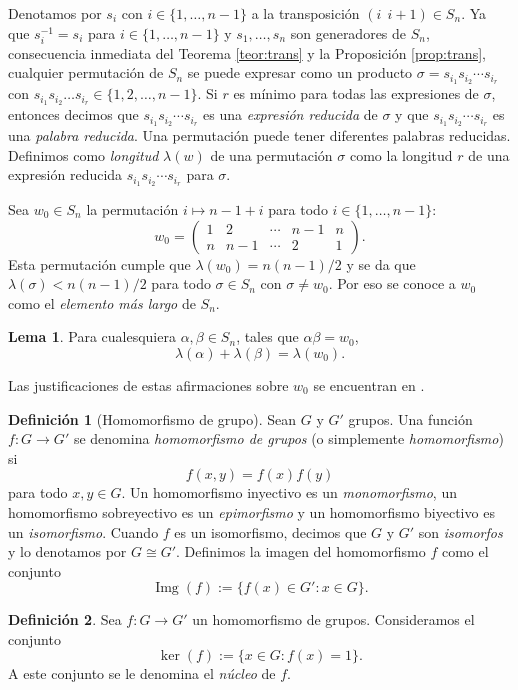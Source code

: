 \documentclass[12pt]{book}
\theoremstyle{definition}
\newtheorem{defi}{Definición}[section]
\newtheorem{lema}{Lema}[section]
\DeclareMathOperator{\img}{Img}
\begin{document}
Denotamos por $s_i$ con $i\in\{1,\ldots,n-1\}$ a la transposición $(i\ \ i+1)\in S_n$. Ya que $s_i^{-1}= s_i$ para $i\in\{1,\ldots,n-1\}$ y $s_1,\ldots,s_n$ son generadores de $S_n$, consecuencia inmediata del Teorema \ref{teor:trans} y la Proposición \ref{prop:trans}, cualquier permutación de $S_n$ se puede expresar como un producto $\sigma = s_{i_1}s_{i_2}\cdots s_{i_r}$ con $s_{i_1}s_{i_2}\ldots s_{i_r}\in\{1,2,\ldots,n-1\}$. Si $r$ es mínimo para todas las expresiones de $\sigma$, entonces decimos que $s_{i_1}s_{i_2}\cdots s_{i_r}$ es una \textit{expresión reducida} de $\sigma$ y que $s_{i_1}s_{i_2}\cdots s_{i_r}$ es una \textit{palabra reducida}. Una permutación puede tener diferentes palabras reducidas. Definimos como \textit{longitud} $\lambda(w)$ de una permutación $\sigma$ como la longitud $r$ de una expresión reducida $s_{i_1}s_{i_2}\cdots s_{i_r}$ para $\sigma$.

Sea $w_0\in S_n$ la permutación $i\mapsto n-1+i$ para todo $i \in\{ 1,\ldots,n-1\}$:
$$w_0 = 
\begin{pmatrix} 
1 & 2 & \cdots & n-1 & n \\
n & n-1 & \cdots & 2 & 1
\end{pmatrix}
.$$
Esta permutación cumple que $\lambda(w_0)=n(n-1)/2$ y se da que $\lambda(\sigma)<n(n-1)/2$ para todo $\sigma\in S_n$ con $\sigma\neq w_0$. Por eso se conoce a $w_0$ como el \textit{elemento más largo} de $S_n$.

\begin{lema}
Para cualesquiera $\alpha,\beta\in S_n$, tales que $\alpha\beta = w_0$,
$$\lambda(\alpha)+\lambda(\beta)=\lambda(w_0).$$
\label{lema:long_per}
\end{lema}
Las justificaciones de estas afirmaciones sobre $w_0$ se encuentran en \cite{br_gr}.


\begin{defi}[Homomorfismo de grupo]
Sean $G$ y $G'$ grupos. Una función $f:G\rightarrow G'$ se denomina \textit{homomorfismo de grupos} (o simplemente \textit{homomorfismo}) si
$$f(x,y)=f(x)f(y)$$
para todo $x,y\in G$. Un homomorfismo inyectivo es un \textit{monomorfismo}, un homomorfismo sobreyectivo es un \textit{epimorfismo} y un homomorfismo biyectivo es un \textit{isomorfismo}. Cuando $f$ es un isomorfismo, decimos que $G$ y $G'$ son \textit{isomorfos} y lo denotamos por $G\cong G'$. Definimos la imagen del homomorfismo $f$ como el conjunto
$$\img(f):= \{f(x)\in G':x\in G\}.$$
\end{defi}

\begin{defi}
Sea $f:G\rightarrow G'$ un homomorfismo de grupos. Consideramos el conjunto
$$\ker(f):=\{x\in G : f(x)=1\}.$$
A este conjunto se le denomina el \textit{núcleo} de $f$.
\end{defi}
\end{document}
